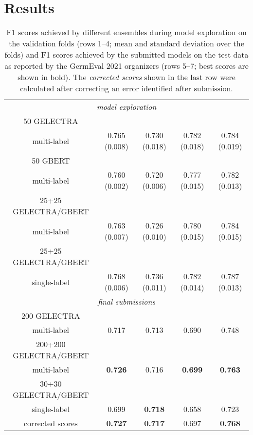 \documentclass[11pt,a4paper]{article}
\begin{document}
\section{Results}

\begin{table*}
    \begin{center}
      \begin{tabular}{c|c|c|c|c}
          &  &  &  & \\
          \hline
          \multicolumn{5}{c}{\textit{model exploration}}\\
          \hline

          50 GELECTRA & & & & \\
          multi-label & 0.765 (0.008) & 0.730 (0.018) & 0.782 (0.018) & 0.784 (0.019) \\
          \hline

          50 GBERT & & & & \\
          multi-label & 0.760 (0.002) & 0.720 (0.006) & 0.777 (0.015) & 0.782 (0.013) \\
          \hline

          25+25 GELECTRA/GBERT & & & & \\
          multi-label & 0.763 (0.007) & 0.726 (0.010) & 0.780 (0.015) & 0.784 (0.015) \\
          \hline

          25+25 GELECTRA/GBERT & & & & \\
          single-label & 0.768 (0.006) & 0.736 (0.011) & 0.782 (0.014) & 0.787 (0.013) \\
          \hline
          \hline
          \multicolumn{5}{c}{\textit{final submissions}}\\
          \hline

          200 GELECTRA & & & & \\
          multi-label & 0.717 & 0.713 & 0.690 & 0.748 \\
          \hline

          200+200 GELECTRA/GBERT & & & & \\
          multi-label & \textbf{0.726} & 0.716 & \textbf{0.699} & \textbf{0.763} \\
          \hline

          30+30 GELECTRA/GBERT & & & & \\
          single-label & 0.699 & \textbf{0.718} & 0.658 & 0.723 \\
          corrected scores & \textbf{0.727} & \textbf{0.717} & 0.697 & \textbf{0.768} \\
      \end{tabular}
    \end{center}
    \caption{
        F1 scores achieved by different ensembles during model exploration on the validation folds (rows 1--4; mean and standard deviation over the folds) and F1 scores achieved by the submitted models on the test data as reported by the GermEval 2021 organizers (rows 5--7; best scores are shown in bold).
        The \emph{corrected scores} shown in the last row were calculated after correcting an error identified after submission.
      }
      \label{tab:f1scores}
\end{table*}
\end{document}
